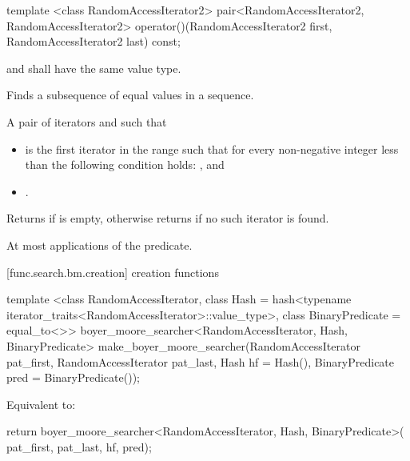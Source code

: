 %
\begin{itemdecl}
template <class RandomAccessIterator2>
  pair<RandomAccessIterator2, RandomAccessIterator2>
    operator()(RandomAccessIterator2 first, RandomAccessIterator2 last) const;
\end{itemdecl}

\begin{itemdescr}
\pnum
\requires
{} and  shall have the same value type.

\pnum
\effects
Finds a subsequence of equal values in a sequence.

\pnum
\returns
A pair of iterators  and  such that
\begin{itemize}
\item {} is the first iterator
in the range  such that
for every non-negative integer  less than 
the following condition holds:
, and
\item {}.
\end{itemize}
Returns  if  is empty,
otherwise returns  if no such iterator is found.

\pnum
\complexity
At most  applications of the predicate.
\end{itemdescr}

[func.search.bm.creation]{ creation functions}

%
\begin{itemdecl}
template <class RandomAccessIterator,
          class Hash = hash<typename iterator_traits<RandomAccessIterator>::value_type>,
          class BinaryPredicate = equal_to<>>
  boyer_moore_searcher<RandomAccessIterator, Hash, BinaryPredicate>
    make_boyer_moore_searcher(RandomAccessIterator pat_first,
                              RandomAccessIterator pat_last,
                              Hash hf = Hash(),
                              BinaryPredicate pred = BinaryPredicate());
\end{itemdecl}

\begin{itemdescr}
\pnum
\effects
Equivalent to:
\begin{codeblock}
return boyer_moore_searcher<RandomAccessIterator, Hash, BinaryPredicate>(
    pat_first, pat_last, hf, pred);
\end{codeblock}
\end{itemdescr}

